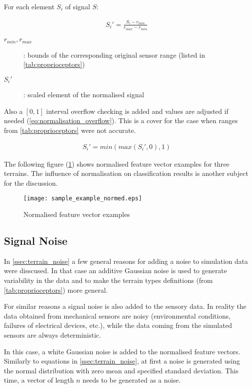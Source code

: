 For each element $ S_i $ of signal $ S $:

\begin{align} \label{eq:normalisation}
S_i' = \frac{S_i - r_{min}}{r_{max} - r_{min}} 
\end{align}

\begin{description}
\item[$ r_{min}, r_{max} $] : bounds of the corresponding original sensor range (listed in \cref{tab:proprioceptors})
\item[$ S_i' $] : scaled element of the normalised signal
\end{description}

Also a $ [0, 1] $ interval overflow checking is added and values are adjusted if needed (\cref{eq:normalisation_overflow}). This is a cover for the case when ranges from \cref{tab:proprioceptors} were not accurate.

\begin{align} \label{eq:normalisation_overflow}
S_i' = min(max(S_i', 0), 1)
\end{align}

The following figure (\ref{fig:sample_example_normed}) shows normalised feature vector examples for three terrains. The influence of normalisation on classification results is another subject for the discussion.

\begin{figure}[H]
  \centering
  \texttt{[image: sample\_example\_normed.eps]}
  \caption{Normalised feature vector examples}
  \label{fig:sample_example_normed}
\end{figure}

\subsection{Signal Noise} \label{ssec:signal_noise}
In \cref{ssec:terrain_noise} a few general reasons for adding a noise to simulation data were disscused. In that case an additive Gaussian noise is used to generate variability in the data and to make the terrain types definitions (from \cref{tab:proprioceptors}) more general.

For similar reasons a signal noise is also added to the sensory data. In reality the data obtained from mechanical sensors are noisy (environmental conditions, failures of electrical devices, etc.), while the data coming from the simulated sensors are always deterministic.

In this case, a white Gaussian noise is added to the normalised feature vectors. Similarly to equations in \cref{ssec:terrain_noise}, at first a noise is generated using the normal distribution with zero mean and specified standard deviation. This time, a vector of length $ n $ needs to be generated as a noise.

